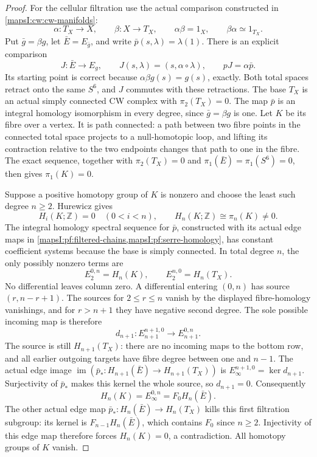 \begin{proof}
For the cellular filtration use the actual comparison constructed in
\cref{mapsI:cw:cw-manifolds}:
\[
 \alpha:T_X\longrightarrow X,\qquad
 \beta:X\longrightarrow T_X,\qquad
 \alpha\beta=1_X,\qquad \beta\alpha\simeq1_{T_X}.
\]
Put \(\bar g=\beta g\), let \(\bar E=E_{\bar g}\), and write
\(\bar p(s,\lambda)=\lambda(1)\).  There is an explicit comparison
\[
 J:\bar E\longrightarrow E_g,\qquad
 J(s,\lambda)=(s,\alpha\circ\lambda),
 \qquad pJ=\alpha\bar p.
\]
Its starting point is correct because
\(\alpha\beta g(s)=g(s)\), exactly.  Both total spaces retract onto the
same \(S^6\), and \(J\) commutes with these retractions.  The base
\(T_X\) is an actual simply connected CW complex with \(\pi_2(T_X)=0\).
The map \(\bar p\) is an integral homology isomorphism in every degree,
since \(\bar g=\beta g\) is one.  Let \(K\) be its fibre over a vertex.
It is path connected: a path between two fibre points in the connected
total space projects to a null-homotopic loop, and lifting its contraction
relative to the two endpoints changes that path to one in the fibre.
The exact sequence, together with \(\pi_2(T_X)=0\) and
\(\pi_1(\bar E)=\pi_1(S^6)=0\), then gives \(\pi_1(K)=0\).

Suppose a positive homotopy group of \(K\) is nonzero and choose the least
such degree \(n\ge2\).  Hurewicz gives
\[
 H_i(K;\mathbb Z)=0\quad(0<i<n),\qquad
 H_n(K;\mathbb Z)\cong\pi_n(K)\ne0.
\]
The integral homology spectral sequence for \(\bar p\), constructed
with its actual edge maps in \cref{mapsI:pf:filtered-chains,mapsI:pf:serre-homology},
has constant coefficient systems because the base is simply connected.
In total degree \(n\), the only possibly nonzero terms are
\[
 E_2^{0,n}=H_n(K),\qquad E_2^{n,0}=H_n(T_X).
\]
No differential leaves column zero.  A differential entering \((0,n)\)
has source \((r,n-r+1)\).  The sources for \(2\le r\le n\) vanish by
the displayed fibre-homology vanishings, and for \(r>n+1\) they have
negative second degree.  The sole possible incoming map is therefore
\[
 d_{n+1}:E_{n+1}^{n+1,0}\longrightarrow E_{n+1}^{0,n}.
\]
The source is still \(H_{n+1}(T_X)\): there are no incoming maps to
the bottom row, and all earlier outgoing targets have fibre degree
between one and \(n-1\).  The actual edge image
\(\operatorname{im}(\bar p_*:H_{n+1}(\bar E)\to H_{n+1}(T_X))\)
is \(E_\infty^{n+1,0}=\ker d_{n+1}\).  Surjectivity of \(\bar p_*\)
makes this kernel the whole source, so \(d_{n+1}=0\).
Consequently
\[
 H_n(K)=E_\infty^{0,n}=F_0H_n(\bar E).
\]
The other actual edge map \(\bar p_*:H_n(\bar E)\to H_n(T_X)\)
kills this first filtration subgroup: its kernel is
\(F_{n-1}H_n(\bar E)\), which contains \(F_0\) since \(n\ge2\).
Injectivity of this edge map therefore forces \(H_n(K)=0\), a
contradiction.  All homotopy groups of \(K\) vanish.


\end{proof}
